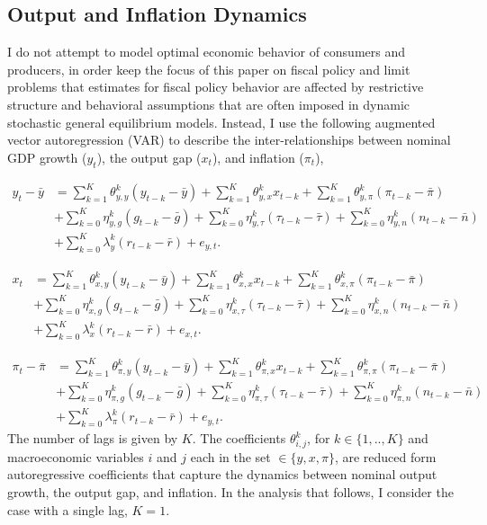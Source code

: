 \documentclass[11pt]{article}
\newcommand{\beq}{\begin{equation}}
\newcommand{\eeq}{\end{equation}}
\newcommand{\ds}{\displaystyle}
\begin{document}
\subsection{Output and Inflation Dynamics}

I do not attempt to model optimal economic behavior of consumers and producers, in order keep the focus of this paper on fiscal policy and limit problems that estimates for fiscal policy behavior are affected by restrictive structure and behavioral assumptions that are often imposed in dynamic stochastic general equilibrium models.  Instead, I use the following augmented vector autoregression (VAR) to describe the inter-relationships between nominal GDP growth ($y_t$), the output gap ($x_t$), and inflation ($\pi_t$),

\beq \label{eq:vary} \begin{array}{ll} \ds y_t - \bar{y} & =  \ds \sum_{k=1}^K \theta_{y,y}^k (y_{t-k} - \bar{y}) + \sum_{k=1}^K \theta_{y,x}^k x_{t-k} + \sum_{k=1}^K \theta_{y,\pi}^k (\pi_{t-k} - \bar{\pi}) \\ [1pc]
  & \ds + \sum_{k=0}^K \eta_{y,g}^k (g_{t-k} - \bar{g}) + \sum_{k=0}^K \eta_{y,\tau}^k (\tau_{t-k} - \bar{\tau}) + \sum_{k=0}^K \eta_{y,n}^k (n_{t-k} - \bar{n}) \\ [1pc]
  & \ds + \sum_{k=0}^K \lambda_{y}^k (r_{t-k} - \bar{r}) + e_{y,t}. \end{array} \eeq

\beq \label{eq:varx} \begin{array}{ll} \ds x_t  & =  \ds \sum_{k=1}^K \theta_{x,y}^k (y_{t-k} - \bar{y}) + \sum_{k=1}^K \theta_{x,x}^k x_{t-k} + \sum_{k=1}^K \theta_{x,\pi}^k (\pi_{t-k} - \bar{\pi}) \\ [1pc]
  & \ds + \sum_{k=0}^K \eta_{x,g}^k (g_{t-k} - \bar{g}) + \sum_{k=0}^K \eta_{x,\tau}^k (\tau_{t-k} - \bar{\tau}) + \sum_{k=0}^K \eta_{x,n}^k (n_{t-k} - \bar{n}) \\ [1pc]
  & \ds + \sum_{k=0}^K \lambda_{x}^k (r_{t-k} - \bar{r}) + e_{x,t}. \end{array} \eeq


\beq \label{eq:varpi} \begin{array}{ll} \ds \pi_t - \bar{\pi} & =  \ds \sum_{k=1}^K \theta_{\pi,y}^k (y_{t-k} - \bar{y}) + \sum_{k=1}^K \theta_{\pi,x}^k x_{t-k} + \sum_{k=1}^K \theta_{\pi,\pi}^k (\pi_{t-k} - \bar{\pi}) \\ [1pc]
  & \ds + \sum_{k=0}^K \eta_{\pi,g}^k (g_{t-k} - \bar{g}) + \sum_{k=0}^K \eta_{\pi,\tau}^k (\tau_{t-k} - \bar{\tau}) + \sum_{k=0}^K \eta_{\pi,n}^k (n_{t-k} - \bar{n}) \\ [1pc]
  & \ds + \sum_{k=0}^K \lambda_{\pi}^k (r_{t-k} - \bar{r}) + e_{y,t}. \end{array} \eeq
The number of lags is given by $K$.  The coefficients $\theta_{i,j}^k$, for $k \in \{1,..,K\}$ and macroeconomic variables $i$ and $j$ each in the set $\in \{y, x, \pi\}$, are reduced form autoregressive coefficients that capture the dynamics between nominal output growth, the output gap, and inflation.  In the analysis that follows, I consider the case with a single lag, $K=1$.
\end{document}
